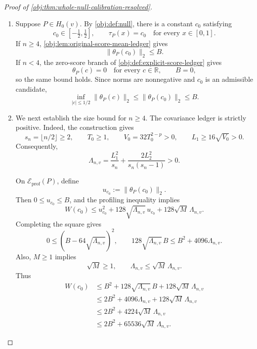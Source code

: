 \begin{proof}[Proof of \cref{obj:thm:whole-null-calibration-resolved}]
\begin{enumerate}
\item Suppose \(P\in H_0(v)\). By \cref{obj:def:null}, there is a constant \(c_0\) satisfying
\[
c_0\in[-\tfrac12,\tfrac12],
\qquad
\tau_P(x)=c_0\quad\text{for every }x\in[0,1].
\]
If \(n\ge4\), \cref{obj:lem:original-score-mean-ledger} gives
\[
\|\theta_P(c_0)\|_2\le B.
\]
If \(n<4\), the zero-score branch of \cref{obj:def:explicit-score-ledger} gives
\[
\theta_P(c)=0\quad\text{for every }c\in\mathbb R,
\qquad B=0,
\]
so the same bound holds. Since norms are nonnegative and \(c_0\) is an admissible candidate,
\[
\inf_{|c|\le1/2}\|\theta_P(c)\|_2
\le \|\theta_P(c_0)\|_2
\le B.
\]

\item We next establish the size bound for \(n\ge4\). The covariance ledger is strictly positive. Indeed, the construction gives
\[
s_n=\lfloor n/2\rfloor\ge2,
\qquad
T_0\ge1,
\qquad
V_0=32T_0^{2-p}>0,
\qquad
L_1\ge16\sqrt{V_0}>0.
\]
Consequently,
\[
\Lambda_{n,v}
=
\frac{L_1^2}{s_n}
+\frac{2L_2^2}{s_n(s_n-1)}
>0.
\]

On \(\mathcal E_{\mathrm{prof}}(P)\), define
\[
u_{c_0}:=\|\theta_P(c_0)\|_2.
\]
Then \(0\le u_{c_0}\le B\), and the profiling inequality implies
\[
W(c_0)
\le
u_{c_0}^2
+128\sqrt{\Lambda_{n,v}}\,u_{c_0}
+128\sqrt M\,\Lambda_{n,v}.
\]
Completing the square gives
\[
0\le\left(B-64\sqrt{\Lambda_{n,v}}\right)^2,
\qquad
128\sqrt{\Lambda_{n,v}}\,B
\le B^2+4096\Lambda_{n,v}.
\]
Also, \(M\ge1\) implies
\[
\sqrt M\ge1,
\qquad
\Lambda_{n,v}\le\sqrt M\,\Lambda_{n,v}.
\]
Thus
\[
\begin{aligned}
W(c_0)
&\le B^2+128\sqrt{\Lambda_{n,v}}\,B
       +128\sqrt M\,\Lambda_{n,v}\\
&\le2B^2+4096\Lambda_{n,v}
       +128\sqrt M\,\Lambda_{n,v}\\
&\le2B^2+4224\sqrt M\,\Lambda_{n,v}\\
&\le2B^2+65536\sqrt M\,\Lambda_{n,v}.
\end{aligned}
\]


\end{enumerate}
\end{proof}
